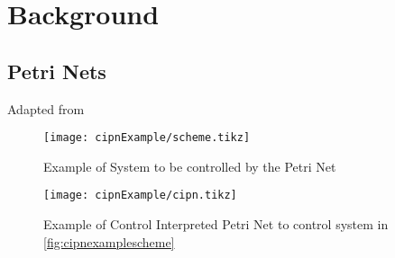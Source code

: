 
\chapter{Background}

\section{Petri Nets}
\label{sec:petriNets}


Adapted from \cite{david1989grafcet}
\begin{figure}[H]
  \centering
  \texttt{[image: cipnExample/scheme.tikz]}
  \caption[cipnexample]{Example of System to be controlled by the Petri Net}
  \label{fig:cipnexamplescheme}
\end{figure}

\pagebreak
\begin{figure}[H]
  \centering
  \texttt{[image: cipnExample/cipn.tikz]}
  \caption[cipnexample]{Example of Control Interpreted Petri Net to control
    system in \autoref{fig:cipnexamplescheme}}
  \label{fig:cipnexample}
\end{figure}






